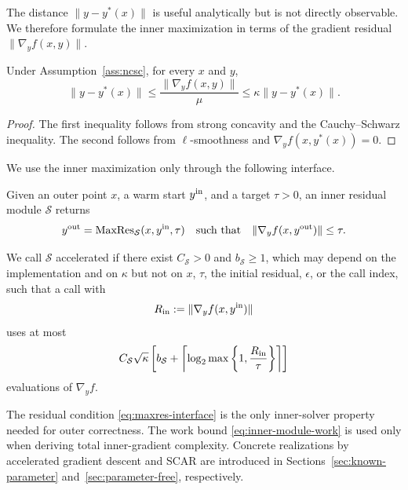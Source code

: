 The distance $\|y-y^*(x)\|$ is useful analytically but is not directly
observable. We therefore formulate the inner maximization in terms of
the gradient residual $\|\nabla_yf(x,y)\|$.

\begin{lemma}
\label{lem:inner-residual-certificate}
Under Assumption~\ref{ass:ncsc}, for every $x$ and $y$,
\begin{equation}
    \|y-y^*(x)\|
    \le
    \frac{\|\nabla_yf(x,y)\|}{\mu}
    \le
    \kappa\|y-y^*(x)\|.
    \label{eq:inner-residual-certificate}
\end{equation}
\end{lemma}

\begin{proof}
The first inequality follows from strong concavity and the
Cauchy--Schwarz inequality. The second follows from
$\ell$-smoothness and $\nabla_yf(x,y^*(x))=0$.
\end{proof}

We use the inner maximization only through the following interface.

\begin{definition}
\label{def:inner-residual-module}
Given an outer point $x$, a warm start $y^{\rm in}$, and a target
$\tau>0$, an inner residual module $\mathcal S$ returns
\begin{equation}
    y^{\rm out}
    =
    \operatorname{MaxRes}_{\mathcal S}
    (x,y^{\rm in},\tau)
    \quad\text{such that}\quad
    \|\nabla_yf(x,y^{\rm out})\|\le\tau.
    \label{eq:maxres-interface}
\end{equation}

We call $\mathcal S$ accelerated if there exist
$C_{\mathcal S}>0$ and $b_{\mathcal S}\ge1$, which may depend on the
implementation and on $\kappa$ but not on
$x$, $\tau$, the initial residual, $\epsilon$, or the call index,
such that a call with
\[
    R_{\rm in}:=
    \|\nabla_yf(x,y^{\rm in})\|
\]
uses at most
\begin{equation}
    C_{\mathcal S}\sqrt{\kappa}
    \left[
        b_{\mathcal S}
        +
        \left\lceil
        \log_2
        \max\left\{
            1,\frac{R_{\rm in}}{\tau}
        \right\}
        \right\rceil
    \right]
    \label{eq:inner-module-work}
\end{equation}
evaluations of $\nabla_yf$.
\end{definition}

The residual condition \eqref{eq:maxres-interface} is the only
inner-solver property needed for outer correctness. The work bound
\eqref{eq:inner-module-work} is used only when deriving total
inner-gradient complexity. Concrete realizations by accelerated
gradient descent and SCAR are introduced in
Sections~\ref{sec:known-parameter} and~\ref{sec:parameter-free},
respectively.

